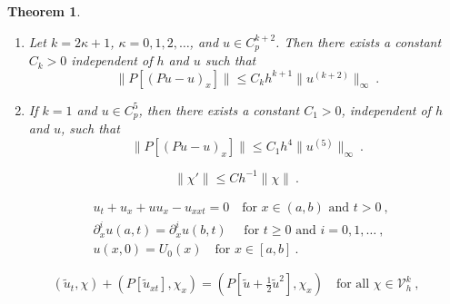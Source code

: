 \documentclass[10pt,a4paper]{amsart}
\newtheorem{theorem}{Theorem}
\newcommand{\tu}{\tilde{u}}
\begin{document}
\begin{theorem}\label{thm:main1}
\begin{enumerate}
\item[(i)] Let $k=2\kappa+1$, $\kappa=0,1,2,\dots$, and $u\in C_p^{k+2}$. Then there exists a constant $C_k>0$ independent of $h$ and $u$ such that
\begin{equation}\label{eq:onepone}
\|P[(Pu-u)_x]\|\leq C_k h^{k+1}\|u^{(k+2)}\|_\infty\ .
\end{equation}
\item[(ii)]
If $k=1$ and $u\in C_p^5$, then there exists a constant $C_1>0$, independent of $h$ and $u$, such that
\begin{equation}\label{eq:oneptwo}
\|P[(Pu-u)_x]\|\leq C_1 h^4\|u^{(5)}\|_\infty\ .
\end{equation}
\end{enumerate}
\end{theorem}

\begin{equation}\label{eq:inverse}
\|\chi'\|\leq Ch^{-1}\|\chi\|\ .
\end{equation}

\begin{equation}\label{eq:ipbvp}
\begin{aligned}
&u_t+u_x+uu_x-u_{xxt}= 0 \quad\text{for $x\in (a,b)$ and $t>0$}\ ,\\
& \partial^i_x u(a,t)=\partial^i_x u(b,t) \quad \text{ for $t\geq 0$ and $i=0,1,\dots$}\ ,\\
& u(x,0)=U_0(x)\quad \text{for $x\in[a,b]$}\ .
\end{aligned}
\end{equation}

\begin{equation}\label{eq:semid}
(\tu_t,\chi)+(P[\tu_{xt}],\chi_x)=(P[\tu+\tfrac{1}{2}\tu^2],\chi_x)\quad \text{for all $\chi\in \mathcal{V}_h^k$}\ ,
\end{equation}
\end{document}
